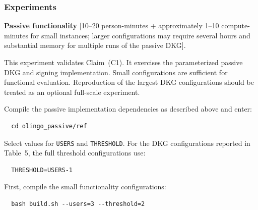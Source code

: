 \documentclass[nonacm,sigconf]{acmart}
\begin{document}

\subsubsection{Experiments}


\bigskip
\begin{compactitem}
  \item[(E1):] \textbf{Passive functionality} [10--20 person-minutes + approximately 1--10 compute-minutes for small instances; larger configurations may require several hours and substantial memory for multiple runs of the passive DKG].

  This experiment validates Claim~(C1). It exercises the parameterized passive DKG and signing implementation. Small configurations are sufficient for functional evaluation. Reproduction of the largest DKG configurations should be treated as an optional full-scale experiment.

  \begin{asparadesc}
    \item[Preparation:] Compile the passive implementation dependencies as described above and enter:
\begin{verbatim}
  cd olingo_passive/ref
\end{verbatim}

    Select values for \texttt{USERS} and \texttt{THRESHOLD}. For the DKG configurations reported in Table~5, the full threshold configurations use:

\begin{verbatim}
  THRESHOLD=USERS-1
\end{verbatim}

  \item[Execution:] First, compile the small functionality configurations:

\begin{verbatim}
  bash build.sh --users=3 --threshold=2
\end{verbatim}


\end{asparadesc}
\end{compactitem}
\end{document}
